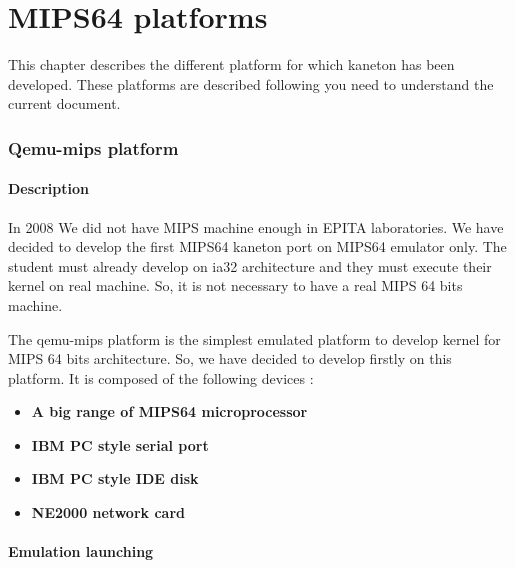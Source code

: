 %
%
%
%
%
%

%
%

\chapter{MIPS64 platforms}

This chapter describes the different platform for which kaneton has been developed. These platforms are described following you need to understand the current document.


\subsection{Qemu-mips platform}

\subsubsection{Description}

In 2008 We did not have MIPS machine enough in EPITA laboratories. We have decided to develop the first MIPS64 kaneton
port on MIPS64 emulator only. The student must already develop on ia32 architecture and they must execute their kernel
on real machine. So, it is not necessary to have a real MIPS 64 bits machine.

The qemu-mips platform is the simplest emulated platform to develop kernel for MIPS 64 bits architecture. So, we have decided to develop firstly on this platform. It is composed of the following devices :

\begin{itemize}
  \item
    \textbf{A big range of MIPS64 microprocessor}
  \item
    \textbf{IBM PC style serial port}
  \item
    \textbf{IBM PC style IDE disk}
  \item
    \textbf{NE2000 network card}
\end{itemize}
 
\subsubsection{Emulation launching}

